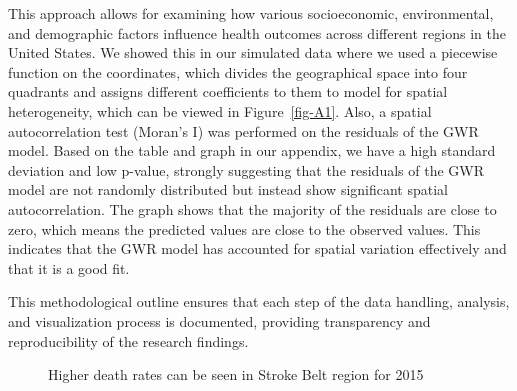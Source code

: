 \documentclass[
]{article}
\begin{document}
This approach allows for examining how various socioeconomic,
environmental, and demographic factors influence health outcomes across
different regions in the United States. We showed this in our simulated
data where we used a piecewise function on the coordinates, which
divides the geographical space into four quadrants and assigns different
coefficients to them to model for spatial heterogeneity, which can be
viewed in Figure~\ref{fig-A1}. Also, a spatial autocorrelation test
(Moran's I) was performed on the residuals of the GWR model. Based on
the table and graph in our appendix, we have a high standard deviation
and low p-value, strongly suggesting that the residuals of the GWR model
are not randomly distributed but instead show significant spatial
autocorrelation. The graph shows that the majority of the residuals are
close to zero, which means the predicted values are close to the
observed values. This indicates that the GWR model has accounted for
spatial variation effectively and that it is a good fit.

This methodological outline ensures that each step of the data handling,
analysis, and visualization process is documented, providing
transparency and reproducibility of the research findings.

\begin{figure}[!ht]


\caption{\label{fig-1}Higher death rates can be seen in Stroke Belt
region for 2015}

\end{figure}%
\end{document}
